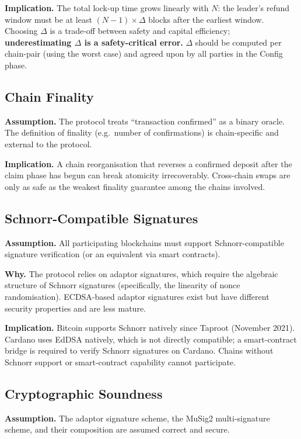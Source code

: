 \documentclass[11pt,a4paper]{article}
\begin{document}
\textbf{Implication.}\;
The total lock-up time grows linearly with $N$: the leader's refund window
must be at least $(N{-}1) \times \Delta$ blocks after the earliest window.
Choosing $\Delta$ is a trade-off between safety and capital efficiency;
\textbf{underestimating $\Delta$ is a safety-critical error.}
$\Delta$ should be computed per chain-pair (using the worst case) and
agreed upon by all parties in the Config phase.

\subsection{Chain Finality}

\textbf{Assumption.}\;
The protocol treats ``transaction confirmed'' as a binary oracle.
The definition of finality (e.g.\ number of confirmations) is
chain-specific and external to the protocol.

\textbf{Implication.}\;
A chain reorganisation that reverses a confirmed deposit after the claim
phase has begun can break atomicity irrecoverably.
Cross-chain swaps are only as safe as the weakest finality guarantee among
the chains involved.

\subsection{Schnorr-Compatible Signatures}

\textbf{Assumption.}\;
All participating blockchains must support Schnorr-compatible signature
verification (or an equivalent via smart contracts).

\textbf{Why.}\;
The protocol relies on adaptor signatures, which require the algebraic
structure of Schnorr signatures (specifically, the linearity of nonce
randomisation).
ECDSA-based adaptor signatures exist but have different security properties
and are less mature.

\textbf{Implication.}\;
Bitcoin supports Schnorr natively since Taproot (November 2021).
Cardano uses EdDSA natively, which is not directly compatible; a
smart-contract bridge is required to verify Schnorr signatures on Cardano.
Chains without Schnorr support or smart-contract capability cannot
participate.

\subsection{Cryptographic Soundness}

\textbf{Assumption.}\;
The adaptor signature scheme, the MuSig2 multi-signature scheme, and their
composition are assumed correct and secure.
\end{document}
